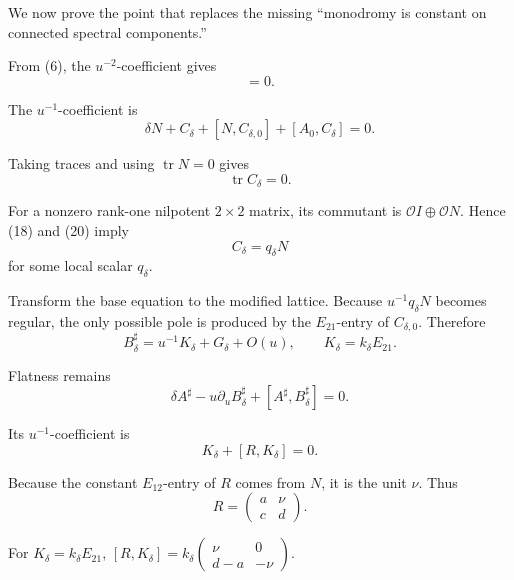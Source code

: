 \documentclass[11pt]{article}
\theoremstyle{definition}
\theoremstyle{remark}
\begin{document}
We now prove the point that replaces the missing ``monodromy is constant on
connected spectral components.''

From (6), the $u^{-2}$-coefficient gives
\begin{equation}
  [N,C_\delta]=0.
  \tag{18}
\end{equation}

The $u^{-1}$-coefficient is
\begin{equation}
  \delta N+C_\delta+[N,C_{\delta,0}]+[A_0,C_\delta]=0.
  \tag{19}
\end{equation}

Taking traces and using $\operatorname{tr}N=0$ gives
\begin{equation}
  \operatorname{tr}C_\delta=0.
  \tag{20}
\end{equation}

For a nonzero rank-one nilpotent $2\times2$ matrix, its commutant is
$\mathcal OI\oplus\mathcal ON$. Hence (18) and (20) imply
\begin{equation}
  C_\delta=q_\delta N
  \tag{21}
\end{equation}
for some local scalar $q_\delta$.

Transform the base equation to the modified lattice. Because $u^{-1}q_\delta N$
becomes regular, the only possible pole is produced by the $E_{21}$-entry of
$C_{\delta,0}$. Therefore
\begin{equation}
  B^\sharp_\delta=u^{-1}K_\delta+G_\delta+O(u),\qquad
  K_\delta=k_\delta E_{21}.
  \tag{22}
\end{equation}

Flatness remains
\begin{equation}
  \delta A^\sharp-u\partial_uB^\sharp_\delta+[A^\sharp,B^\sharp_\delta]=0.
  \tag{23}
\end{equation}

Its $u^{-1}$-coefficient is
\begin{equation}
  K_\delta+[R,K_\delta]=0.
  \tag{24}
\end{equation}

Because the constant $E_{12}$-entry of $R$ comes from $N$, it is the unit $\nu$.
Thus
\begin{equation}
  R=\begin{pmatrix}a&\nu\\c&d\end{pmatrix}.
  \tag{25}
\end{equation}

For $K_\delta=k_\delta E_{21}$,
$[R,K_\delta]=k_\delta\begin{pmatrix}\nu&0\\d-a&-\nu\end{pmatrix}$.
\end{document}
